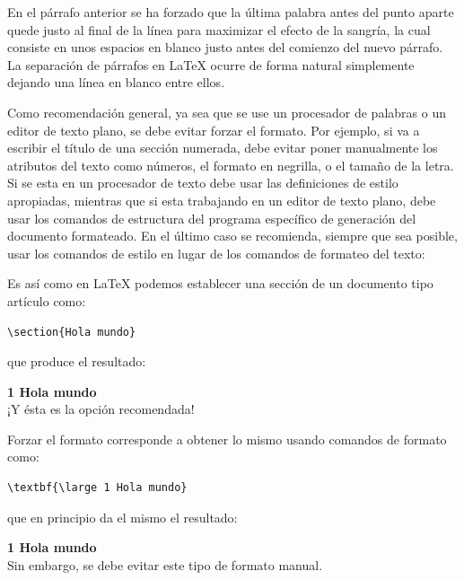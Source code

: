 \documentclass{article}
\begin{document}
En el párrafo anterior se ha forzado que la última palabra antes del punto aparte quede justo al final de la línea para maximizar el efecto de la sangría, la  cual consiste en unos espacios en blanco justo antes del comienzo del nuevo párrafo. La separación de párrafos en LaTeX ocurre de forma natural simplemente dejando una línea en blanco entre ellos. 

Como recomendación general, ya sea que se use un procesador de palabras o un editor de texto plano, se debe evitar forzar el formato. Por ejemplo, si va a escribir el título de una sección numerada, debe evitar poner manualmente los atributos del texto como números, el formato en negrilla, o el tamaño de la letra. Si se esta en un procesador de texto debe usar las definiciones de estilo apropiadas, mientras que si esta trabajando en un editor de texto plano, debe usar los comandos de estructura del programa específico de generación del documento formateado. En el último caso se recomienda, siempre que sea posible, usar los comandos de estilo en lugar de los comandos de formateo del texto:

Es así como en \LaTeX{} podemos establecer una sección de un documento tipo artículo como:
\begin{lstlisting}
\section{Hola mundo}
\end{lstlisting}
que produce el resultado:

\noindent \textbf{\large 1 Hola mundo}\\
¡Y ésta es la opción recomendada!     

Forzar el formato corresponde a obtener lo mismo usando comandos de formato como:
\begin{lstlisting}
\textbf{\large 1 Hola mundo}
\end{lstlisting}
que en principio da el mismo el resultado:

\noindent \textbf{\large 1 Hola mundo}\\
Sin embargo, se debe evitar este tipo de formato manual.
\end{document}
